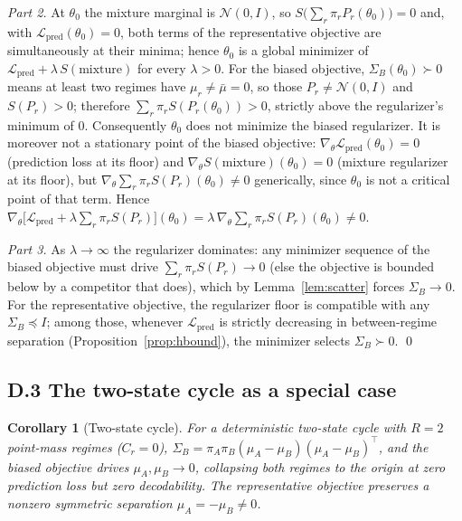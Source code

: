 \documentclass[10pt]{article}
\newtheorem{corollary}{Corollary}
\theoremstyle{remark}
\begin{document}
\emph{Part 2.} At $\theta_0$ the mixture marginal is $\mathcal{N}(0,I)$, so $S\bigl(\sum_r \pi_r P_r(\theta_0)\bigr) = 0$ and, with $\mathcal{L}_{\mathrm{pred}}(\theta_0) = 0$, both terms of the representative objective are simultaneously at their minima; hence $\theta_0$ is a global minimizer of $\mathcal{L}_{\mathrm{pred}} + \lambda\, S(\text{mixture})$ for every $\lambda > 0$. For the biased objective, $\Sigma_B(\theta_0) \succ 0$ means at least two regimes have $\mu_r \neq \bar{\mu} = 0$, so those $P_r \neq \mathcal{N}(0,I)$ and $S(P_r) > 0$; therefore $\sum_r \pi_r S(P_r(\theta_0)) > 0$, strictly above the regularizer's minimum of $0$. Consequently $\theta_0$ does not minimize the biased regularizer. It is moreover not a stationary point of the biased objective: $\nabla_\theta \mathcal{L}_{\mathrm{pred}}(\theta_0) = 0$ (prediction loss at its floor) and $\nabla_\theta S(\text{mixture})(\theta_0) = 0$ (mixture regularizer at its floor), but $\nabla_\theta \sum_r \pi_r S(P_r)(\theta_0) \neq 0$ generically, since $\theta_0$ is not a critical point of that term. Hence $\nabla_\theta\bigl[\mathcal{L}_{\mathrm{pred}} + \lambda \sum_r \pi_r S(P_r)\bigr](\theta_0) = \lambda\, \nabla_\theta \sum_r \pi_r S(P_r)(\theta_0) \neq 0$.

\emph{Part 3.} As $\lambda \to \infty$ the regularizer dominates: any minimizer sequence of the biased objective must drive $\sum_r \pi_r S(P_r) \to 0$ (else the objective is bounded below by a competitor that does), which by Lemma~\ref{lem:scatter} forces $\Sigma_B \to 0$. For the representative objective, the regularizer floor is compatible with any $\Sigma_B \preceq I$; among those, whenever $\mathcal{L}_{\mathrm{pred}}$ is strictly decreasing in between-regime separation (Proposition~\ref{prop:hbound}), the minimizer selects $\Sigma_B \succ 0$. \qed

\subsection*{D.3 The two-state cycle as a special case}

\begin{corollary}[Two-state cycle]
\label{cor:twostate}
For a deterministic two-state cycle with $R = 2$ point-mass regimes ($C_r = 0$), $\Sigma_B = \pi_A \pi_B (\mu_A - \mu_B)(\mu_A - \mu_B)^\top$, and the biased objective drives $\mu_A, \mu_B \to 0$, collapsing both regimes to the origin at zero prediction loss but zero decodability. The representative objective preserves a nonzero symmetric separation $\mu_A = -\mu_B \neq 0$.
\end{corollary}
\end{document}
